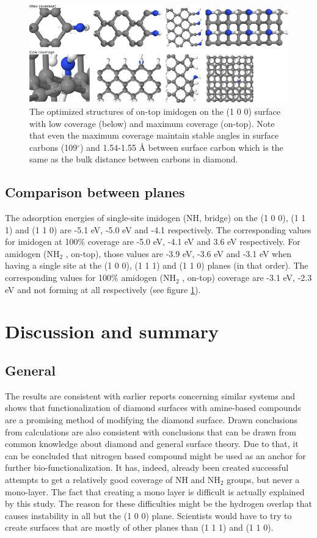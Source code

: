 \documentclass[10pt,a4paper]{article}
\begin{document}
\begin{figure} \captionsetup{width=.8\linewidth} \caption{The optimized structures of on-top imidogen on the (1 0 0) surface with low coverage (below) and maximum coverage (on-top). Note that even the maximum coverage maintain stable angles in surface carbons (109$^{\circ}$) and 1.54-1.55 Å between surface carbon which is the same as the bulk distance between carbons in diamond.} \label{NHdb_summary}
%
\includegraphics[width=.8\linewidth]{pictures/NHdb_summary.png}
\end{figure}



\subsection{Comparison between planes}
The adsorption energies of single-site imidogen (NH, bridge) on the (1 0 0), (1 1 1) and (1 1 0) are -5.1 eV, -5.0 eV and -4.1 respectively. The corresponding values for imidogen at 100\% coverage are -5.0 eV, -4.1 eV and 3.6 eV respectively. For amidogen (NH$_2$ , on-top), those values are -3.9 eV, -3.6 eV and -3.1 eV when having a single site at the (1 0 0), (1 1 1) and (1 1 0) planes (in that order). The corresponding values for 100\% amidogen (NH$_2$ , on-top) coverage are -3.1 eV, -2.3 eV and not forming at all respectively (see figure \ref{NHdb_summary}).

\section{Discussion and summary}
\subsection{General}
The results are consistent with earlier reports concerning similar systems and shows that functionalization of diamond surfaces with amine-based compounds are a promising method of modifying the diamond surface. Drawn conclusions from calculations are also consistent with conclusions that can be drawn from common knowledge about diamond and general surface theory. Due to that, it can be concluded that nitrogen based compound might be used as an anchor for further bio-functionalization. It has, indeed, already been created successful attempts to get a relatively good coverage of NH and NH$_2$ groups, but never a mono-layer. The fact that creating a mono layer is difficult is actually explained by this study. The reason for these difficulties might be the hydrogen overlap that causes instability in all but the (1 0 0) plane. Scientists would have to try to create surfaces that are mostly of other planes than (1 1 1) and (1 1 0). 
\end{document}
